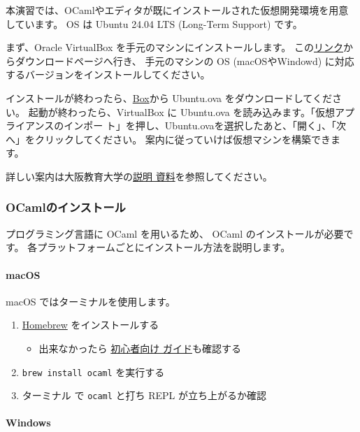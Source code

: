\documentclass[a4paper,11pt]{jsarticle}
\begin{document}
本演習では、OCamlやエディタが既にインストールされた仮想開発環境を用意しています。
OS は Ubuntu 24.04 LTS (Long-Term Support) です。

まず、Oracle VirtualBox を手元のマシンにインストールします。
この\href{https://www.virtualbox.org/wiki/Downloads}{リンク}からダウンロードページへ行き、
手元のマシンの OS (macOSやWindowd) に対応するバージョンをインストールしてください。

インストールが終わったら、\href{https://www.virtualbox.org/wiki/Downloads}{Box}から
Ubuntu.ova をダウンロードしてください。
起動が終わったら、VirtualBox に Ubuntu.ova を読み込みます。「仮想アプライアンスのインポー
ト」を押し、Ubuntu.ovaを選択したあと、「開く」、「次へ」をクリックしてください。
案内に従っていけば仮想マシンを構築できます。

詳しい案内は大阪教育大学の\href{http://mugen.cc.osaka-kyoiku.ac.jp/OS/import_ova.pdf}{説明
  資料}を参照してください。

\subsubsection{OCamlのインストール}

プログラミング言語に OCaml を用いるため、 OCaml のインストールが必要です。
各プラットフォームごとにインストール方法を説明します。

\paragraph{macOS}

macOS ではターミナルを使用します。

\begin{enumerate}
\item \href{https://brew.sh/ja}{Homebrew} をインストールする
  \begin{itemize}
  \item 出来なかったら \href{https://zenn.dev/inablog/articles/5e790c9fbdad20}{初心者向け
      ガイド}も確認する
  \end{itemize}
\item \verb|brew install ocaml| を実行する
\item ターミナル で \verb|ocaml| と打ち REPL が立ち上がるか確認
\end{enumerate}

\paragraph{Windows}
\end{document}
